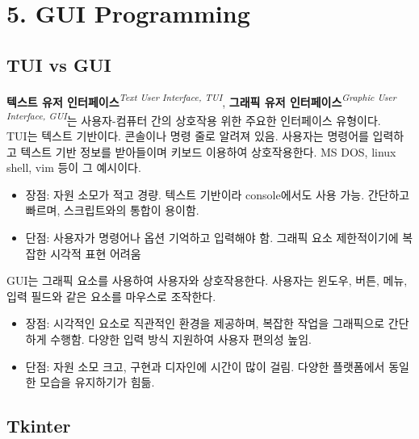 \section[5. GUI Programming - {\it 그래픽 프로그래밍}]{5. GUI Programming}

\subsection{TUI vs GUI}

\textbf{텍스트 유저 인터페이스}\textit{\textsuperscript{Text User Interface, TUI}}, \textbf{그래픽 유저 인터페이스}\textit{\textsuperscript{Graphic User Interface, GUI}}는 사용자-컴퓨터 간의 상호작용 위한 주요한 인터페이스 유형이다.\\
TUI는 텍스트 기반이다. 콘솔이나 명령 줄로 알려져 있음. 사용자는 명령어를 입력하고 텍스트 기반 정보를 받아들이며 키보드 이용하여 상호작용한다. MS DOS, linux shell, vim 등이 그 예시이다.
\begin{itemize}
\item 장점: 자원 소모가 적고 경량. 텍스트 기반이라 console에서도 사용 가능. 간단하고 빠르며, 스크립트와의 통합이 용이함.
\item 단점: 사용자가 명령어나 옵션 기억하고 입력해야 함. 그래픽 요소 제한적이기에 복잡한 시각적 표현 어려움
\end{itemize}

GUI는 그래픽 요소를 사용하여 사용자와 상호작용한다. 사용자는 윈도우, 버튼, 메뉴, 입력 필드와 같은 요소를 마우스로 조작한다.
\begin{itemize}
\item 장점: 시각적인 요소로 직관적인 환경을 제공하며, 복잡한 작업을 그래픽으로 간단하게 수행함. 다양한 입력 방식 지원하여 사용자 편의성 높임.
\item 단점: 자원 소모 크고, 구현과 디자인에 시간이 많이 걸림. 다양한 플랫폼에서 동일한 모습을 유지하기가 힘듦.
\end{itemize}

\subsection{Tkinter}

